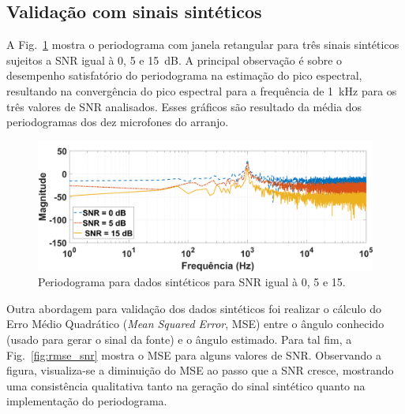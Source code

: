 \documentclass{sbrt2017port}
\begin{document}
\subsection{Validação com sinais sintéticos}

A Fig.~\ref{fig:PSD} mostra o periodograma com janela retangular para três sinais sintéticos sujeitos a SNR igual à 0, 5 e 15~dB. A principal observação é sobre o desempenho satisfatório do periodograma na estimação do pico espectral, resultando na convergência do pico espectral para a frequência de 1~kHz para os três valores de SNR analisados. Esses gráficos são resultado da média dos periodogramas dos dez microfones do arranjo.
\begin{figure}[!htb]
     \centering
     \includegraphics[width=\linewidth]{images/PSD_simulation}
     \caption{Periodograma para dados sintéticos para SNR igual à 0, 5 e 15.}
     \label{fig:PSD}
\end{figure}

Outra abordagem para validação dos dados sintéticos foi realizar o cálculo do Erro Médio Quadrático (\emph{Mean Squared Error}, MSE) entre o ângulo conhecido (usado para gerar o sinal da fonte) e o ângulo estimado. Para tal fim, a Fig.~\ref{fig:rmse_snr} mostra o MSE para alguns valores de SNR. Observando a figura, visualiza-se a diminuição do MSE ao passo que a SNR cresce, mostrando uma consistência qualitativa tanto na geração do sinal sintético quanto na implementação do periodograma.

\end{document}
